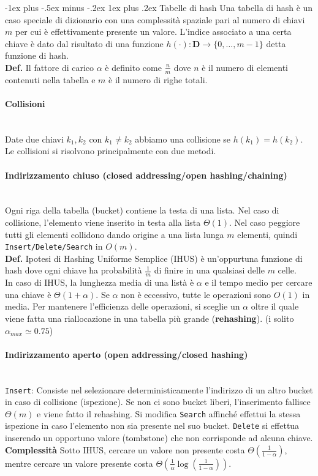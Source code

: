 \documentclass[10pt,landscape]{article}
\makeatletter
\renewcommand{\subsubsection}{\@startsection{subsubsection}{3}{0mm}%
                                {-1ex plus -.5ex minus -.2ex}%
                                {1ex plus .2ex}%
                                {\normalfont\normalsize\bfseries}}
\newcommand{\myparagraph}[1]{\paragraph{#1}\mbox{}\\ [5pt]}
\makeatother
\begin{document}
\begin{multicols*}{4}
                \subsubsection{Tabelle di hash}
                Una tabella di hash è un caso speciale di dizionario con una complessità spaziale pari al numero di chiavi $m$ per cui è effettivamente presente un valore. L'indice associato a una certa chiave è dato dal risultato di una funzione $h(\cdot):\textbf{D} \rightarrow \{0,\dots,m-1\}$ detta funzione di hash. \\[3pt]
                \textbf{Def.} Il fattore di carico $\alpha$ è definito come $\frac{n}{m}$ dove $n$ è il numero di elementi contenuti nella tabella e $m$ è il numero di righe totali.
                \myparagraph{Collisioni}
                Date due chiavi $k_1,k_2$ con $k_1 \neq k_2$ abbiamo una collisione se $h(k_1)=h(k_2)$. Le collisioni si  risolvono principalmente con due metodi.
                \myparagraph{Indirizzamento chiuso (closed addressing/open hashing/chaining)}
                Ogni riga della tabella (bucket) contiene la testa di una lista. Nel caso di collisione, l'elemento viene inserito in testa alla lista $\Theta(1)$. Nel caso peggiore tutti gli elementi collidono dando origine a una lista lunga $m$ elementi, quindi \verb|Insert/Delete/Search| in $O(m)$. \\ [3pt]
                \textbf{Def.} Ipotesi di Hashing Uniforme Semplice (IHUS) è un'oppurtuna funzione di hash dove ogni chiave ha probabilità $\frac{1}{m}$ di finire in una qualsiasi delle $m$ celle.\\ [3pt]
                In caso di IHUS, la lunghezza media di una listà è $\alpha$ e il tempo medio per cercare una chiave è $\Theta(1+\alpha)$. Se $\alpha$ non è eccessivo, tutte le operazioni sono $O(1)$ in media. Per mantenere l'efficienza delle operazioni, si sceglie un $\alpha$ oltre il quale viene fatta una riallocazione in una tabella più grande (\textbf{rehashing}). (i solito $\alpha_{max} \simeq 0.75$)
                \myparagraph{Indirizzamento aperto (open addressing/closed hashing)}
                \verb|Insert|: Consiste nel selezionare deterministicamente l'indirizzo di un altro bucket in caso di collisione (ispezione). Se non ci sono bucket liberi, l'inserimento fallisce $\Theta(m)$ e viene fatto il rehashing. Si modifica \verb|Search| affinché effettui la stessa ispezione in caso l'elemento non sia presente nel suo bucket. \verb|Delete| si effettua inserendo un opportuno valore (tombstone) che non corrisponde ad alcuna chiave. \\ [3pt]\textbf{Complessità} Sotto IHUS, cercare un valore non presente costa $\Theta(\frac{1}{1-\alpha})$, mentre cercare un valore presente costa $\Theta(\frac{1}{\alpha} \log (\frac{1}{1-\alpha}))$.\\ [3pt]

\end{multicols*}
\end{document}

